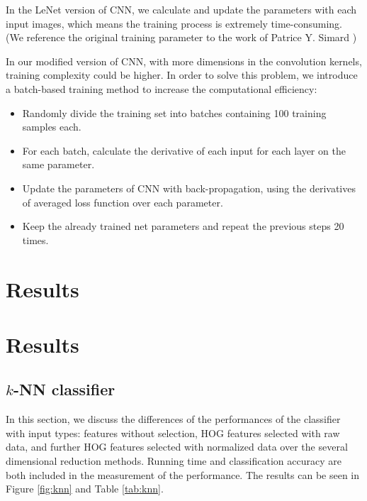 \documentclass[12pt]{article}
\begin{document}
In the LeNet version of CNN, we calculate and update the parameters with each input images, which means the training process is extremely time-consuming. (We reference the original training parameter to the work of Patrice Y. Simard \cite{simard2003best})

In our modified version of CNN, with more dimensions in the convolution kernels, training complexity could be higher. In order to solve this problem, we introduce a batch-based training method to increase the computational efficiency:
\begin{itemize}
\item Randomly divide the training set into batches containing 100 training samples each.
\item For each batch, calculate the derivative of each input for each layer on the same parameter.
\item Update the parameters of CNN with back-propagation, using the derivatives of averaged loss function over each parameter.
\item Keep the already trained net parameters and repeat the previous steps 20 times.
\end{itemize}
\section{Results}
\label{sec:res}



\section{Results}
\label{sec:res}

\subsection{$k$-NN classifier}
In this section, we discuss the differences of the performances of the classifier with input types: features without selection, HOG features selected with raw data, and further HOG features selected with normalized data over the several dimensional reduction methods. Running time and classification accuracy are both included in the measurement of the performance. The results can be seen in Figure \ref{fig:knn} and Table \ref{tab:knn}.
\end{document}
